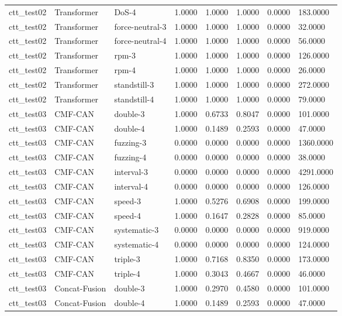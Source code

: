 \begin{tabular}{llllllll}
ctt_test02 & Transformer & DoS-4 & 1.0000 & 1.0000 & 1.0000 & 0.0000 & 183.0000 \\
ctt_test02 & Transformer & force-neutral-3 & 1.0000 & 1.0000 & 1.0000 & 0.0000 & 32.0000 \\
ctt_test02 & Transformer & force-neutral-4 & 1.0000 & 1.0000 & 1.0000 & 0.0000 & 56.0000 \\
ctt_test02 & Transformer & rpm-3 & 1.0000 & 1.0000 & 1.0000 & 0.0000 & 126.0000 \\
ctt_test02 & Transformer & rpm-4 & 1.0000 & 1.0000 & 1.0000 & 0.0000 & 26.0000 \\
ctt_test02 & Transformer & standstill-3 & 1.0000 & 1.0000 & 1.0000 & 0.0000 & 272.0000 \\
ctt_test02 & Transformer & standstill-4 & 1.0000 & 1.0000 & 1.0000 & 0.0000 & 79.0000 \\
ctt_test03 & CMF-CAN & double-3 & 1.0000 & 0.6733 & 0.8047 & 0.0000 & 101.0000 \\
ctt_test03 & CMF-CAN & double-4 & 1.0000 & 0.1489 & 0.2593 & 0.0000 & 47.0000 \\
ctt_test03 & CMF-CAN & fuzzing-3 & 0.0000 & 0.0000 & 0.0000 & 0.0000 & 1360.0000 \\
ctt_test03 & CMF-CAN & fuzzing-4 & 0.0000 & 0.0000 & 0.0000 & 0.0000 & 38.0000 \\
ctt_test03 & CMF-CAN & interval-3 & 0.0000 & 0.0000 & 0.0000 & 0.0000 & 4291.0000 \\
ctt_test03 & CMF-CAN & interval-4 & 0.0000 & 0.0000 & 0.0000 & 0.0000 & 126.0000 \\
ctt_test03 & CMF-CAN & speed-3 & 1.0000 & 0.5276 & 0.6908 & 0.0000 & 199.0000 \\
ctt_test03 & CMF-CAN & speed-4 & 1.0000 & 0.1647 & 0.2828 & 0.0000 & 85.0000 \\
ctt_test03 & CMF-CAN & systematic-3 & 0.0000 & 0.0000 & 0.0000 & 0.0000 & 919.0000 \\
ctt_test03 & CMF-CAN & systematic-4 & 0.0000 & 0.0000 & 0.0000 & 0.0000 & 124.0000 \\
ctt_test03 & CMF-CAN & triple-3 & 1.0000 & 0.7168 & 0.8350 & 0.0000 & 173.0000 \\
ctt_test03 & CMF-CAN & triple-4 & 1.0000 & 0.3043 & 0.4667 & 0.0000 & 46.0000 \\
ctt_test03 & Concat-Fusion & double-3 & 1.0000 & 0.2970 & 0.4580 & 0.0000 & 101.0000 \\
ctt_test03 & Concat-Fusion & double-4 & 1.0000 & 0.1489 & 0.2593 & 0.0000 & 47.0000 \\

\end{tabular}

